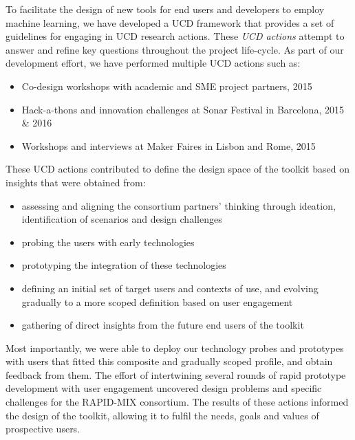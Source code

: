 \documentclass[letterpaper]{article}
\begin{document}
To facilitate the design of new tools for end users and developers to employ machine learning, we have developed a UCD framework that provides a set of guidelines for engaging in UCD research actions. These \textit{UCD actions} attempt to answer and refine key questions throughout the project life-cycle. As part of our development effort, we have performed multiple UCD actions such as:
\begin{itemize}
\item Co-design workshops with academic and SME project partners, 2015
\item Hack-a-thons and innovation challenges at Sonar Festival in Barcelona, 2015 \& 2016
\item Workshops and interviews at Maker Faires in Lisbon and Rome, 2015
\end{itemize}
These UCD actions contributed to define the design space of the toolkit based on insights that were obtained from:
\begin{itemize}
\item assessing and aligning the consortium partners' thinking through ideation, identification of scenarios and design challenges
\item probing the users with early technologies
\item prototyping the integration of these technologies
\item defining an initial set of target users and contexts of use, and evolving gradually to a more scoped definition based on user engagement
\item gathering of direct insights from the future end users of the toolkit
\end{itemize}

Most importantly, we were able to deploy our technology probes and prototypes with users that fitted this composite and gradually scoped profile, and obtain feedback from them. The effort of intertwining several rounds of rapid prototype development with user engagement uncovered design problems and specific challenges for the RAPID-MIX consortium. The results of these actions informed the design of the toolkit, allowing it to fulfil the needs, goals and values of prospective users. 

\end{document}

